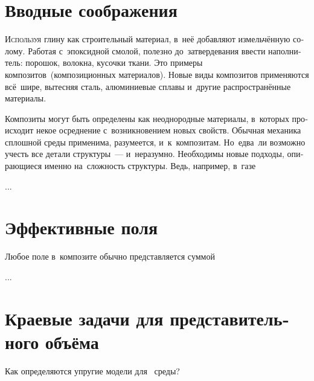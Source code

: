 

\thispagestyle{empty}

\label{chapter:composites}

\begin{otherlanguage}{russian}

\section{Вводные соображения}

\lettrine[lines=2, findent=2pt, nindent=0pt]{И}{спользуя} глину как строительный материал, в~неё добавляют измельчённую солому. Работая с~эпоксидной смолой, полезно до~затвердевания ввести наполнитель: порошок, волокна, кусочки ткани. Это примеры композитов~(композиционных материалов). Новые виды композитов применяются всё~шире, вытесняя сталь, алюминиевые сплавы и~другие распространённые материалы.

Композиты могут быть определены как неоднородные материалы, в~которых происходит некое осреднение с~возникновением новых свойств. Обычная механика сплошной среды применима, разумеется, и~к~композитам. Но~едва~ли возможно учесть все детали структуры~--- и~неразумно. Необходимы новые подходы, опирающиеся именно на~сложность структуры. Ведь, например, в~газе

...



\section{Эффективные поля}

Любое поле в~композите обычно представляется суммой

...



\section{Краевые задачи для представительного объёма}

Как определяются упругие модели для~ среды?


\end{otherlanguage}
